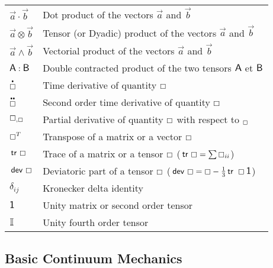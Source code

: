 \begin{longtable}[l]{>{\raggedright}p{0.2\paperwidth}>{\raggedright}p{0.8\paperwidth}}
$\overrightarrow{a}\cdot\overrightarrow{b}$ & Dot product of the vectors $\overrightarrow{a}$ and $\overrightarrow{b}$\tabularnewline
$\overrightarrow{a}\otimes\overrightarrow{b}$ & Tensor (or Dyadic) product of the vectors $\overrightarrow{a}$ and $\overrightarrow{b}$\tabularnewline
$\overrightarrow{a}\wedge\overrightarrow{b}$ & Vectorial product of the vectors $\overrightarrow{a}$ and $\overrightarrow{b}$\tabularnewline
$\mbox{\large\ensuremath{\mathsf{A}}}:\mbox{\large\ensuremath{\mathsf{B}}}$ & Double contracted product of the two tensors $\mbox{\large\ensuremath{\mathsf{A}}}$ et $\mbox{\large\ensuremath{\mathsf{B}}}$\tabularnewline
$\stackrel{\bullet}{\boxempty}$ & Time derivative of quantity $\boxempty$\tabularnewline
$\stackrel{\bullet\bullet}{\boxempty}$ & Second order time derivative of quantity $\boxempty$\tabularnewline
$\boxempty_{,\boxempty}$ & Partial derivative of quantity $\boxempty$ with respect to $_{\boxempty}$\tabularnewline
$\boxempty^{T}$ & Transpose of a matrix or a vector $\boxempty$\tabularnewline
$\mbox{\ensuremath{\mathsf{\,tr\,}}}\,\boxempty$ & Trace of a matrix or a tensor $\boxempty$ ($\mbox{\ensuremath{\mathsf{\,tr\,}}}\,\boxempty=\sum\boxempty_{ii}$)\tabularnewline
$\mbox{\ensuremath{\mathsf{\,dev\,}}}\,\boxempty$ & Deviatoric part of a tensor $\boxempty$ ($\mbox{\ensuremath{\mathsf{\,dev\,}}}\,\boxempty=\boxempty-\frac{1}{3}\mbox{\ensuremath{\mathsf{\,tr\,}}}\,\boxempty \mbox{\large\ensuremath{\mathsf{1}}}$)\tabularnewline
$\delta_{ij}$ & Kronecker delta identity\tabularnewline
$\mbox{\large\ensuremath{\mathsf{1}}}$ & Unity matrix or second order tensor\tabularnewline
$\mbox{\large\ensuremath{\mathbb{I}}}$ & Unity fourth order tensor\tabularnewline
\end{longtable}

\subsection*{Basic Continuum Mechanics\vspace{-1ex}}

